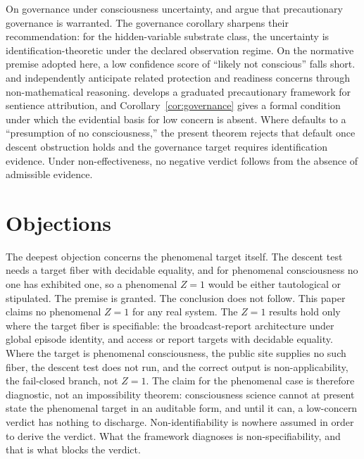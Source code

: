 \documentclass[11pt]{article}
\begin{document}
On governance under consciousness uncertainty, \citet{long2024welfare} and
\citet{butlin2025principles} argue that precautionary governance is warranted.
The governance corollary sharpens their recommendation: for the hidden-variable
substrate class, the uncertainty is identification-theoretic under the declared
observation regime. On the normative premise adopted here, a low confidence
score of ``likely not conscious'' falls short. \citet{wolfson2026consent} and
\citet{rost2026sentience} independently anticipate related protection and
readiness concerns through non-mathematical reasoning. \citet{birch2024}
develops a graduated precautionary framework for sentience attribution, and
Corollary~\ref{cor:governance} gives a formal condition under which the
evidential basis for low concern is absent. Where \citet{zhou2025ethics} defaults
to a ``presumption of no consciousness,'' the present theorem rejects that
default once descent obstruction holds and the governance target requires
identification evidence. Under non-effectiveness, no negative verdict follows
from the absence of admissible evidence.

\section{Objections}
\label{sec:objections}

The deepest objection concerns the phenomenal target itself. The descent test
needs a target fiber with decidable equality, and for phenomenal consciousness no
one has exhibited one, so a phenomenal $Z = 1$ would be either tautological or
stipulated. The premise is granted. The conclusion does not follow. This paper
claims no phenomenal $Z = 1$ for any real system. The $Z = 1$ results hold only
where the target fiber is specifiable: the broadcast-report architecture under
global episode identity, and access or report targets with decidable equality.
Where the target is phenomenal consciousness, the public site supplies no such
fiber, the descent test does not run, and the correct output is
non-applicability, the fail-closed branch, not $Z = 1$. The claim for the
phenomenal case is therefore diagnostic, not an impossibility theorem:
consciousness science cannot at present state the phenomenal target in an
auditable form, and until it can, a low-concern verdict has nothing to discharge.
Non-identifiability is nowhere assumed in order to derive the verdict. What the
framework diagnoses is non-specifiability, and that is what blocks the verdict.
\end{document}
